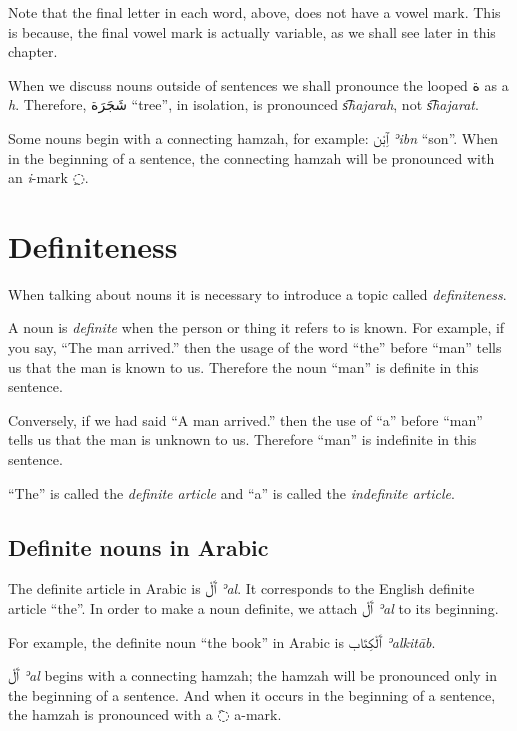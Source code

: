 \documentclass[
  10pt,
]{book}
\begin{document}
Note that the final letter in each word, above, does not have a vowel mark. This is because, the final vowel mark is actually variable, as we shall see later in this chapter.

When we discuss nouns outside of sentences we shall pronounce the looped \foreignlanguage{arabic}{ة} as a \emph{h}. Therefore,
\foreignlanguage{arabic}{شَجَرَة} \enquote{tree}, in isolation, is pronounced \emph{s͡hajarah}, not \emph{s͡hajarat}.

Some nouns begin with a connecting hamzah, for example: \foreignlanguage{arabic}{ٱِبْن} \emph{ʾibn} \enquote{son}. When in the beginning of a sentence, the connecting hamzah will be pronounced with an \emph{i}-mark \foreignlanguage{arabic}{◌ِ}.

\section{Definiteness}\label{definiteness}

When talking about nouns it is necessary to introduce a topic called \emph{definiteness}.

A noun is \emph{definite} when the person or thing it refers to is known. For example, if you say, \enquote{The man arrived.} then the usage of the word \enquote{the} before \enquote{man} tells us that the man is known to us. Therefore the noun \enquote{man} is definite in this sentence.

Conversely, if we had said \enquote{A man arrived.} then the use of \enquote{a} before \enquote{man} tells us that the man is unknown to us. Therefore \enquote{man} is indefinite in this sentence.

\enquote{The} is called the \emph{definite article} and \enquote{a} is called the \emph{indefinite article}.

\subsection{Definite nouns in Arabic}\label{definite-nouns-in-arabic}

The definite article in Arabic is
\foreignlanguage{arabic}{ٱَلْ} \emph{ʾal}. It corresponds to the English definite article \enquote{the}.
In order to make a noun definite, we attach
\foreignlanguage{arabic}{ٱَلْ} \emph{ʾal}
to its beginning.

For example, the definite noun \enquote{the book} in Arabic is \foreignlanguage{arabic}{ٱَلْکِتَاب} \emph{ʾalkitāb}.

\foreignlanguage{arabic}{ٱَلْ} \emph{ʾal}
begins with a connecting hamzah; the hamzah will be pronounced only in the beginning of a sentence. And when it occurs in the beginning of a sentence, the hamzah is pronounced with a \foreignlanguage{arabic}{◌َ} a-mark.
\end{document}
